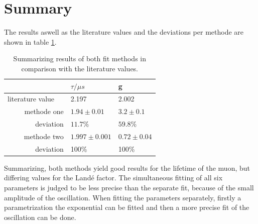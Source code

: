 \documentclass{include/thesisclass3}
\begin{document}
\section{Summary}
The results aswell as the literature values and the deviations per methode are shown in table \ref{tablö}.\\

\begin{table}[H]
\caption{\label{tablö}Summarizing results of both fit methods in comparison with the literature values.}
\begin{center}
\begin{tabular}{r|ll}
 & $\tau /\mu s$ & g \\ 
\toprule
literature value $\quad$& 2.197 & 2.002 \\ 
\midrule
methode one & $1.94 \pm 0.01$ & $3.2\pm 0.1$ \\ 
deviation & $11.7$\% & $59.8$\% \\ 
\midrule 
methode two & $1.997 \pm 0.001$ & $ 0.72 \pm 0.04$ \\  
deviation & 100\% & 100\%  
\label{tablö}
\end{tabular} 
\end{center}
\end{table}

Summarizing, both methods yield good results for the lifetime of the muon, but differing values for the Landé factor. 
The simultaneous fitting of all six parameters is judged to be less precise than the separate fit, because of the small amplitude of the oscillation.
When fitting the parameters separately, firstly a parametrization the exponential can be fitted and then a more precise fit of the oscillation can be done.  
\end{document}
